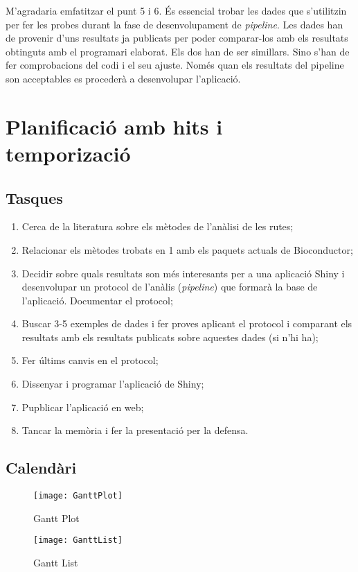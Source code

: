 \documentclass[]{article}
\begin{document}
M'agradaria emfatitzar el punt 5 i 6. És essencial trobar les dades que s'utilitzin per fer les probes durant la fase de desenvolupament de \textit{pipeline}. Les dades han de provenir d'uns resultats ja publicats per poder comparar-los amb els resultats obtinguts amb el programari elaborat. Els dos han de ser simillars. Sino s'han de fer comprobacions del codi i el seu ajuste. Només quan els resultats del pipeline son acceptables es procederà a desenvolupar l'aplicació. 


\section{Planificació amb hits i temporizació}
\subsection{Tasques}
\begin{enumerate}
\item Cerca de la literatura sobre els mètodes de l'anàlisi de les rutes;
\item Relacionar els mètodes trobats en 1 amb els paquets actuals de Bioconductor;
\item Decidir sobre quals resultats son més interesants per a una aplicació Shiny i desenvolupar un protocol de l'anàlis (\textit{pipeline}) que formarà la base de l'aplicació. Documentar el protocol;
\item Buscar 3-5 exemples de dades i fer proves aplicant el protocol i comparant els resultats amb els resultats publicats sobre aquestes dades (si n'hi ha);
\item Fer últims canvis en el protocol;
\item Dissenyar i programar l'aplicació de Shiny;
\item Pupblicar l'aplicació en web;
\item Tancar la memòria i fer la presentació per la defensa.
\end{enumerate}

\subsection{Calendàri}

\begin{figure}[H]
\caption{Gantt Plot}
\centering
\texttt{[image: GanttPlot]}
\end{figure}

\begin{figure}[H]
\caption{Gantt List}
\centering
\texttt{[image: GanttList]}
\end{figure}
\end{document}
